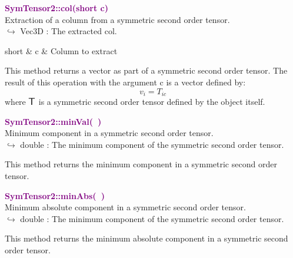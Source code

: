 \textcolor{purple}{\textbf{SymTensor2::col(short c)}}\label{SymTensor2::col(short c)}\\
Extraction of a column from a symmetric second order tensor.\\ \hspace*{10mm}$\hookrightarrow$ Vec3D : The extracted col.

\begin{tcolorbox}[width=\textwidth,myArgs,tabularx={ll|R}]
short & c & Column to extract
\end{tcolorbox}

This method returns a vector as part of a symmetric second order tensor.
The result of this operation with the argument c is a vector defined by:
\begin{equation*}
v_{i} = T_{ic}
\end{equation*}
where $\mbox{\large\ensuremath{\mathsf{T}}}$ is a symmetric second order tensor defined by the object itself.

\textcolor{purple}{\textbf{SymTensor2::minVal(~)}}\label{SymTensor2::minVal()}\\
Minimum component in a symmetric second order tensor.\\ \hspace*{10mm}$\hookrightarrow$ double : The minimum component of the symmetric second order tensor.

This method returns the minimum component in a symmetric second order tensor.

\textcolor{purple}{\textbf{SymTensor2::minAbs(~)}}\label{SymTensor2::minAbs()}\\
Minimum absolute component in a symmetric second order tensor.\\ \hspace*{10mm}$\hookrightarrow$ double : The minimum component of the symmetric second order tensor.

This method returns the minimum absolute component in a symmetric second order tensor.

